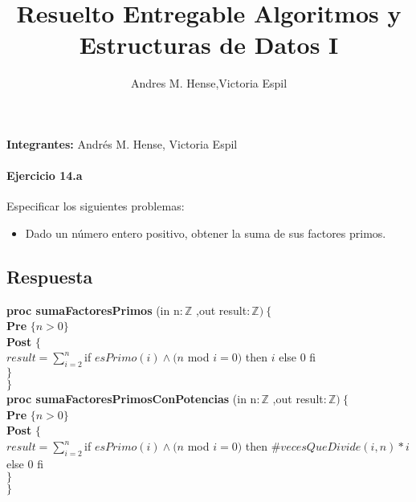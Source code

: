 \documentclass[a4paper]{article}
\title{Resuelto Entregable Algoritmos y Estructuras de Datos I}
\author{Andres M. Hense,Victoria Espil}
\date{} %
\begin{document}




\begin{center}
\textbf{Integrantes:} Andrés M. Hense, Victoria Espil
\end{center}

\paragraph*{Ejercicio 14.a} Especificar los siguientes problemas:
	\begin{itemize}
		\item Dado un número entero positivo, obtener la suma de sus factores primos.
	\end{itemize}
	
\subsection*{Respuesta}

			\textbf{proc sumaFactoresPrimos }(in n$:\mathbb{Z}$
				,out result$: \mathbb{Z} )\ \{$\smallskip \\
			\hspace*{6mm} \textbf{Pre }$\{n>0 \}$\smallskip \\
			\hspace*{6mm} \textbf{Post }$\{$\\
			\hspace*{6mm} $result=\sum_{i=2}^{n}$if $esPrimo(i)\wedge(n$ mod $i=0)$
			 then $i$ else 0 fi\\
			\hspace*{6mm} $\}$\\
			\hspace*{5mm}$\}$\smallskip \\
			
			\textbf{proc sumaFactoresPrimosConPotencias }(in n$:\mathbb{Z}$
				,out result$: \mathbb{Z} )\ \{$\smallskip \\
			\hspace*{6mm} \textbf{Pre }$\{n>0 \}$\smallskip \\
			\hspace*{6mm} \textbf{Post }$\{$\\
			\hspace*{6mm} $result=\sum_{i=2}^{n}$if $esPrimo(i)\wedge(n$ mod $i=0)$
			 then $\#vecesQueDivide(i,n)*i$ else 0 fi\\
			\hspace*{6mm} $\}$\\
			\hspace*{5mm}$\}$\smallskip \\
			
\end{document}
